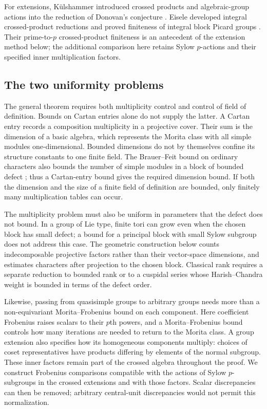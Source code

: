 For extensions, K\"ulshammer introduced crossed products and
algebraic-group actions into the reduction of Donovan's conjecture
\cite{Kulshammer1995}.  Eisele developed integral crossed-product
reductions and proved finiteness of integral block Picard groups
\cite{EiseleReduction,EiselePicard}.  Their prime-to-\(p\)
crossed-product finiteness is an antecedent of the extension method
below; the additional comparison here retains Sylow \(p\)-actions
and their specified inner multiplication factors.

\subsection{The two uniformity problems}

The general theorem requires both multiplicity control and control
of field of definition.  Bounds on Cartan entries alone do not
supply the latter.  A Cartan entry records a composition multiplicity
in a projective cover.  Their sum is the dimension of a basic algebra,
which represents the Morita class with all simple modules
one-dimensional.  Bounded dimensions do not by themselves confine
its structure constants to one finite field.  The Brauer--Feit
bound on ordinary characters also bounds the number of simple
modules in a block of bounded defect \cite{BrauerFeit}; thus a
Cartan-entry bound gives the required dimension bound.  If both
the dimension
and the size of a finite field of definition are bounded, only finitely many
multiplication tables can occur.

The multiplicity problem must also be uniform in parameters that
the defect does not bound.  In a group of Lie type, finite tori can
grow even when the chosen block has small defect; a bound for a
principal block with small Sylow subgroup does not address this
case.  The geometric construction below counts indecomposable
projective factors rather than their vector-space dimensions,
and estimates characters after projection to the chosen block.
Classical rank requires a separate reduction to bounded rank or
to a cuspidal series whose Harish--Chandra weight is bounded in
terms of the defect order.

Likewise, passing from quasisimple groups to
arbitrary groups needs more than a non-equivariant Morita--Frobenius
bound on each component.  Here coefficient Frobenius raises scalars
to their \(p\)th powers, and a Morita--Frobenius bound controls how
many iterations are needed to return to the Morita class.
A group extension also specifies how its homogeneous components
multiply: choices of coset representatives have products differing
by elements of the normal subgroup.  These inner factors remain
part of the crossed algebra throughout the proof.  We construct
Frobenius comparisons compatible with the actions of Sylow
\(p\)-subgroups in the crossed extensions and with those factors.
Scalar discrepancies can
then be removed; arbitrary central-unit discrepancies would not
permit this normalization.

